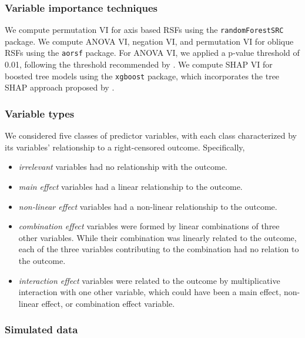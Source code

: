 \documentclass[twoside,11pt]{article}\usepackage[]{graphicx}\usepackage[]{xcolor}
\begin{document}
\subsubsection{Variable importance techniques}

We compute permutation VI for axis based RSFs using the \texttt{randomForestSRC} package. We compute ANOVA VI, negation VI, and permutation VI for oblique RSFs using the \texttt{aorsf} package. For ANOVA VI, we applied a p-value threshold of 0.01, following the threshold recommended by \citet{menze2011oblique}. We compute SHAP VI for boosted tree models using the \texttt{xgboost} package, which incorporates the tree SHAP approach proposed by \citet{lundberg2018consistent}.


\subsubsection{Variable types}

We considered five classes of predictor variables, with each class characterized by its variables' relationship to a right-censored outcome. Specifically, \begin{itemize}
\item \textit{irrelevant} variables had no relationship with the outcome.
\item \textit{main effect} variables had a linear relationship to the outcome.
\item \textit{non-linear effect} variables had a non-linear relationship to the outcome.
\item \textit{combination effect} variables were formed by linear combinations of three other variables. While their combination was linearly related to the outcome, each of the three variables contributing to the combination had no relation to the outcome.
\item \textit{interaction effect} variables were related to the outcome by multiplicative interaction with one other variable, which could have been a main effect, non-linear effect, or combination effect variable.
\end{itemize}


\subsubsection{Simulated data}
\end{document}
